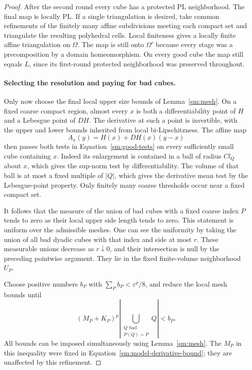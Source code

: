 \documentclass[11pt]{article}
\numberwithin{equation}{section}
\theoremstyle{definition}
\theoremstyle{remark}
\begin{document}
\begin{proof}
After the second round every cube has a
protected PL neighborhood.  The final map is
locally PL.  If a single triangulation is
desired, take common refinements of the
finitely many affine subdivisions meeting
each compact set and triangulate the resulting
polyhedral cells.  Local finiteness gives a
locally finite affine triangulation on
$\Omega$.  The map is still onto $\Omega'$
because every stage was a precomposition by
a domain homeomorphism.  On every good cube
the map still equals $L$, since its first-round
protected neighborhood was preserved throughout.

\paragraph{Selecting the resolution and paying for bad cubes.}
Only now choose the final local upper size
bounds of Lemma~\ref{sm:mesh}.  On a fixed
coarse compact region, almost every $x$ is
both a differentiability point of $H$ and a
Lebesgue point of $DH$.  The derivative at
such a point is invertible, with the upper
and lower bounds inherited from local
bi-Lipschitzness.  The affine map
\[
 A_x(y)=H(x)+DH(x)(y-x)
\]
then passes both tests in
Equation~\eqref{sm:good-tests} on every sufficiently
small cube containing $x$.  Indeed its
enlargement is contained in a ball of radius
$C l_Q$ about $x$, which gives the sup-norm
test by differentiability.  The volume of
that ball is at most a fixed multiple of
$|Q|$, which gives the derivative mean test
by the Lebesgue-point property.  Only
finitely many coarse thresholds occur near
a fixed compact set.

It follows that the measure of the union of
bad cubes with a fixed coarse index $P$
tends to zero as their local upper side
length tends to zero.  This statement is
uniform over the admissible meshes.  One
can see the uniformity by taking the union
of all bad dyadic cubes with that index
and side at most $r$.  These measurable
unions decrease as $r\downarrow0$, and
their intersection is null by the preceding
pointwise argument.  They lie in the fixed
finite-volume neighborhood $U_P$.

Choose positive numbers $b_P$ with
$\sum_Pb_P<\varepsilon^p/8$, and reduce the
local mesh bounds until
\begin{equation}
 \label{sm:bad-error-budget}
 (M_P+K_P)^p
 \left|\bigcup_{\substack{Q\text{ bad}\\P(Q)=P}}Q\right|
 <b_P.
\end{equation}
All bounds can be imposed simultaneously
using Lemma~\ref{sm:mesh}.  The $M_P$ in
this inequality were fixed in
Equation~\eqref{sm:model-derivative-bound}; they
are unaffected by this refinement.


\end{proof}
\end{document}
